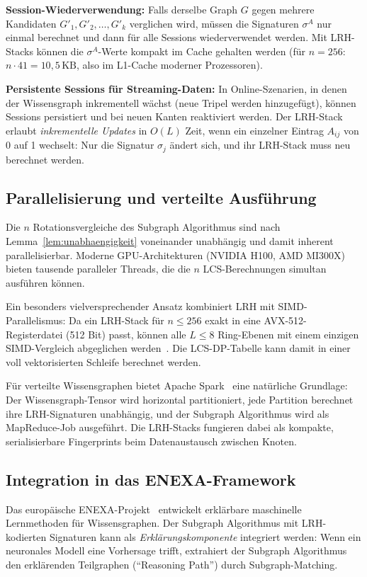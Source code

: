 ﻿\documentclass[a4paper,12pt]{article}
\theoremstyle{definition}
\begin{document}
\textbf{Session-Wiederverwendung:} Falls derselbe Graph $G$ gegen mehrere Kandidaten
$G'_1, G'_2, \ldots, G'_k$ verglichen wird, müssen die Signaturen $\sigma^A$ nur
einmal berechnet und dann für alle Sessions wiederverwendet werden. Mit LRH-Stacks
können die $\sigma^A$-Werte kompakt im Cache gehalten werden (für $n=256$:
$n \cdot 41 = 10{,}5\,\text{KB}$, also im L1-Cache moderner Prozessoren).

\textbf{Persistente Sessions für Streaming-Daten:} In Online-Szenarien, in denen der
Wissensgraph inkrementell wächst (neue Tripel werden hinzugefügt), können Sessions
persistiert und bei neuen Kanten reaktiviert werden. Der LRH-Stack erlaubt
\emph{inkrementelle Updates} in $O(L)$ Zeit, wenn ein einzelner Eintrag $A_{ij}$
von 0 auf 1 wechselt: Nur die Signatur $\sigma_j$ ändert sich, und ihr LRH-Stack
muss neu berechnet werden.

\subsection{Parallelisierung und verteilte Ausführung}

Die $n$ Rotationsvergleiche des Subgraph Algorithmus sind nach
Lemma~\ref{lem:unabhaengigkeit} voneinander unabhängig und damit inherent
parallelisierbar. Moderne GPU-Architekturen (NVIDIA H100, AMD MI300X) bieten
tausende paralleler Threads, die die $n$ LCS-Berechnungen simultan ausführen können.

Ein besonders vielversprechender Ansatz kombiniert LRH mit SIMD-Parallelismus:
Da ein LRH-Stack für $n \leq 256$ exakt in eine AVX-512-Registerdatei (512 Bit)
passt, können alle $L \leq 8$ Ring-Ebenen mit einem einzigen SIMD-Vergleich
abgeglichen werden~\cite{nvidia2022}. Die LCS-DP-Tabelle kann damit in einer
voll vektorisierten Schleife berechnet werden.

Für verteilte Wissensgraphen bietet Apache Spark~\cite{zaharia2016} eine natürliche
Grundlage: Der Wissensgraph-Tensor wird horizontal partitioniert, jede Partition
berechnet ihre LRH-Signaturen unabhängig, und der Subgraph Algorithmus wird als
MapReduce-Job ausgeführt. Die LRH-Stacks fungieren dabei als kompakte, serialisierbare
Fingerprints beim Datenaustausch zwischen Knoten.

\subsection{Integration in das ENEXA-Framework}

Das europäische ENEXA-Projekt~\cite{enexa2023} entwickelt erklärbare
maschinelle Lernmethoden für Wissensgraphen. Der Subgraph Algorithmus mit
LRH-kodierten Signaturen kann als \emph{Erklärungskomponente} integriert werden:
Wenn ein neuronales Modell eine Vorhersage trifft, extrahiert der Subgraph Algorithmus
den erklärenden Teilgraphen (``Reasoning Path'') durch Subgraph-Matching.
\end{document}
